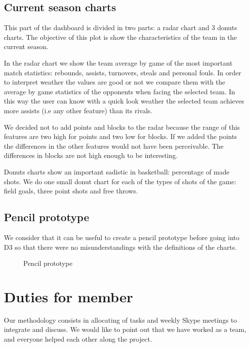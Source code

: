 \documentclass[11pt, a4paper]{article}
\begin{document}
\subsection{Current season charts}
This part of the dashboard is divided in two parts: a radar chart and 3 donuts charts. The objective of this plot is show the characteristics of the team in the current season.

\medskip

In the radar chart we show the team average by  game  of the most important match statistics: rebounds, assists, turnovers, steals and personal fouls. In order to interpret weather the values are good or not we compare them with the average by game statistics of the opponents when facing the selected team. In this way the user can know with a quick look weather the selected team achieves more assists (i.e any other feature) than its rivals.

\medskip

We decided not to add points and blocks to the radar  because the range of this features are two high for points and two low for blocks. If we added the points the differences in the other features would not have been perceivable. The differences in blocks are not high enough to be interesting. 

\medskip

Donuts charts show an important sadistic in basketball: percentage of made shots. We do one small donut chart for each of the types of shots of the game: field goals, three point shots and free throws.

\subsection{Pencil prototype}

We consider that it can be useful to create a pencil prototype before going into D3 so that there were no misunderstandings with the definitions of the charts. 
\bigskip
\begin{figure}[H]
\centering
\caption{Pencil prototype}
\end{figure}

\section{Duties for member}

Our methodology consists in allocating of tasks and weekly Skype meetings to integrate and discuss. We would like to point out that we have worked as a team, and everyone helped each other along the project. 
\end{document}
